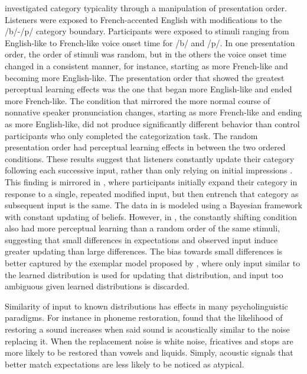 \citet{Sumner2011} investigated category typicality through a manipulation of presentation order. 
Listeners were exposed to French-accented English with modifications to the /b/-/p/ category boundary.
Participants were exposed to stimuli ranging from English-like to French-like voice onset time for /b/ and /p/.
In one presentation order, the order of stimuli was random, but in the others the voice onset time changed in a consistent manner, for instance, starting as more French-like and becoming more English-like.
The presentation order that showed the greatest perceptual learning effects was the one that began more English-like and ended more French-like.
The condition that mirrored the more normal course of nonnative speaker pronunciation changes, starting as more French-like and ending as more English-like, did not produce significantly different behavior than control participants who only completed the categorization task.
The random presentation order had perceptual learning effects in between the two ordered conditions.
These results suggest that listeners constantly update their category following each successive input, rather than only relying on initial impressions \citep[contra][]{Kraljic2008}.
This finding is mirrored in \citet{Vroomen2007}, where participants initially expand their category in response to a single, repeated modified input, but then entrench that category as subsequent input is the same.
The data in \citet{Vroomen2007} is modeled using a Bayesian framework with constant updating of beliefs.
However, in \citet{Sumner2011}, the constantly shifting condition also had more perceptual learning than a random order of the same stimuli, suggesting that small differences in expectations and observed input induce greater updating than large differences.
The bias towards small differences is better captured by the exemplar model proposed by \citet{Pierrehumbert2001}, where only input similar to the learned distribution is used for updating that distribution, and input too ambiguous given learned distributions is discarded.

Similarity of input to known distributions has effects in many psycholinguistic paradigms.
For instance in phoneme restoration, \citet{Samuel1981} found that the likelihood of restoring a sound increases when said sound is acoustically similar to the noise replacing it.  
When the replacement noise is white noise, fricatives and stops are more likely to be restored than vowels and liquids.
Simply, acoustic signals that better match expectations are less likely to be noticed as atypical.

